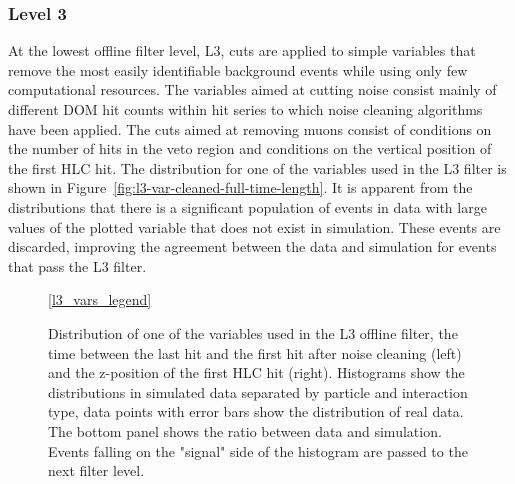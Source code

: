 \subsubsection{Level 3}
At the lowest offline filter level, L3, cuts are applied to simple variables that remove the most easily identifiable background events while using only few computational resources. The variables aimed at cutting noise consist mainly of different DOM hit counts within hit series to which noise cleaning algorithms have been applied. The cuts aimed at removing muons consist of conditions on the number of hits in the veto region and conditions on the vertical position of the first HLC hit. The distribution for one of the variables used in the L3 filter is shown in Figure~\ref{fig:l3-var-cleaned-full-time-length}. It is apparent from the distributions that there is a significant population of events in data with large values of the plotted variable that does not exist in simulation. These events are discarded, improving the agreement between the data and simulation for events that pass the L3 filter.
%     
%     

\begin{figure}
    \centering
    \ref{l3_vars_legend}\par
    
    
    
    \caption{Distribution of one of the variables used in the L3 offline filter, the time between the last hit and the first hit after noise cleaning (left) and the z-position of the first HLC hit (right). Histograms show the distributions in simulated data separated by particle and interaction type, data points with error bars show the distribution of real data. The bottom panel shows the ratio between data and simulation. Events falling on the "signal" side of the histogram are passed to the next filter level.}
    \label{fig:l3-cut-vars}
\end{figure}

